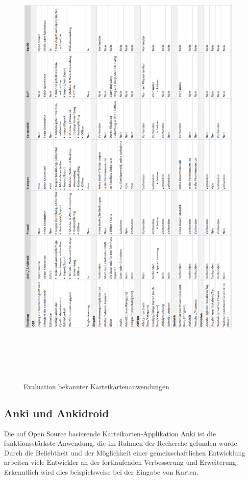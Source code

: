 \begin{figure}[htbp]
\begin{center}
\includegraphics[width = 15cm, height=23cm]{evaluation.png}
\caption{Evaluation bekannter Karteikartenanwendungen}
\label{Evaluation bekannter Karteikartenanwendungen}

\end{center}
\end{figure}

\subsection{Anki und Ankidroid}
Die auf Open Source basierende Karteikarten-Applikation Anki \cite{ankiwebseite} \cite{ankidev} ist die funktionsstärkste Anwendung, die im Rahmen der Recherche gefunden wurde. Durch die Beliebtheit und der Möglichkeit einer gemeinschaftlichen Entwicklung arbeiten viele Entwickler an der fortlaufenden Verbesserung und Erweiterung. Erkenntlich wird dies beispielsweise bei der Eingabe von Karten. 

